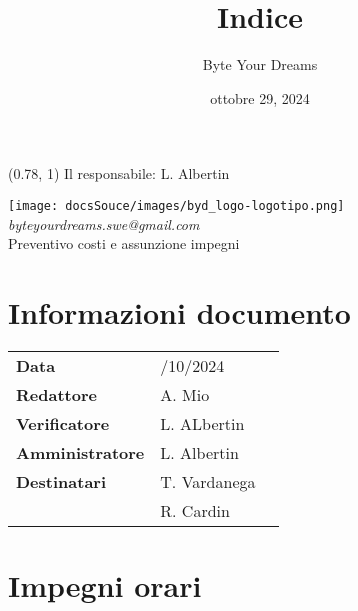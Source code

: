 \documentclass{article}
\title{\textbf{\fontsize{28}{6}\selectfont Indice}}
\author{\fontsize{14}{6}\selectfont Byte Your Dreams}
\date{ottobre 29, 2024}
\begin{document}
\begin{textblock*}{\textwidth}(0.78\textwidth, 1\textheight)
    Il responsabile: L. Albertin
\end{textblock*}
\pagestyle{fancy}
\begin{center}
\vspace*{-2cm}
\texttt{[image: docsSouce/images/byd\_logo-logotipo.png]}
\fontsize{12}{6}\textcolor[RGB]{60, 60, 60}{\textit{byteyourdreams.swe@gmail.com}} \\
\vspace{0.5cm}
\fontsize{16}{6}\selectfont Preventivo costi e assunzione impegni \\
\vspace{0.5cm}
\end{center}

\section*{Informazioni documento}
\def\arraystretch{1.2}
\begin{tabular}{>{\raggedleft\arraybackslash}p{}|>{\raggedright\arraybackslash}p{}c}
\hline
\addlinespace
\textbf{Data} & 29/10/2024 \vspace{10pt} \\
\textbf{Redattore} & A. Mio \vspace{10pt} \\
\textbf{Verificatore} & L. ALbertin \vspace{10pt} \\
\textbf{Amministratore} & L. Albertin \vspace{10pt} \\
\textbf{Destinatari} & T. Vardanega \\ & R. Cardin \vspace{10pt}
\end{tabular}

\pagebreak 





\flushleft

\section{Impegni orari}
\end{document}
